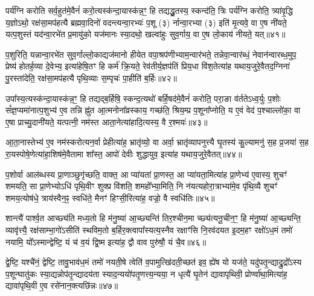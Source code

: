{\anuvakamend[{आ॒घा॒रम्प॑द्यन्ते॒ द्वाद॑शा॒त्मन्ने॒व य॒ज्ञस्य॒ मेध्य॑मे॒व खलु॒ वा अ॒ष्टाद॑श च}]}%

पर्य॑ग्नि करोति सर्व॒हुत॑मे॒वैनं॑ करो॒त्यस्क॑न्दा॒यास्क॑न्न॒ꣳ॒ हि तद्यद्धु॒तस्य॒ स्कन्द॑ति॒ त्रिः पर्य॑ग्नि करोति॒ त्र्या॑वृ॒द्धि य॒ज्ञो\-ऽथो॒ रक्ष॑सा॒मप॑हत्यै ब्रह्मवा॒दिनो॑ वदन्त्यन्वा॒रभ्यः॑ प॒शू (३) र्नान्वा॒रभ्या (३) इति॑ मृ॒त्यवे॒ वा ए॒ष नी॑यते॒ यत्प॒शुस्तं यद॑न्वा॒रभे॑त प्र॒मायु॑को॒ यज॑मानः स्या॒दथो॒ खल्वा॑हुः सुव॒र्गाय॒ वा ए॒ष लो॒काय॑ नीयते॒ यत्॥४१॥

प॒शुरिति॒ यन्नान्वा॒रभे॑त सुव॒र्गाल्लो॒काद्यज॑मानो हीयेत वपा॒श्रप॑णीभ्याम॒न्वार॑भते॒ तन्नेवा॒न्वार॑ब्धं॒ नेवान॑न्वारब्ध॒मुप॒ प्रेष्य॑ होतर्\mbox{}ह॒व्या दे॒वेभ्य॒ इत्या॑हेषि॒तꣳ हि कर्म॑ क्रि॒यते॒ रेव॑तीर्य॒ज्ञप॑तिं प्रिय॒धा वि॑श॒तेत्या॑ह यथाय॒जुरे॒वैतद॒ग्निना॑ पु॒रस्ता॑देति॒ रक्ष॑सा॒मप॑हत्यै पृथि॒व्याः स॒म्पृचः॑ पा॒हीति॑ ब॒र्\mbox{}हिः॥४२॥

उपा᳚स्य॒त्यस्क॑न्दा॒यास्क॑न्न॒ꣳ॒ हि तद्यद्ब॒र्\mbox{}हिषि॒ स्कन्द॒त्यथो॑ बर्\mbox{}हि॒षद॑मे॒वैनं॑ करोति॒ परा॒ङा व॑र्तते\-ऽध्व॒र्युः प॒शोः सं᳚ज्ञ॒प्यमा॑नात्प॒शुभ्य॑ ए॒व तन्नि ह्नु॑त आ॒त्मनोना᳚व्रस्काय॒ गच्छ॑ति॒ श्रिय॒म्प्र प॒शूना᳚प्नोति॒ य ए॒वं वेद॑ प॒श्चाल्लो॑का॒ वा ए॒षा प्राच्यु॒दानी॑यते॒ यत्पत्नी॒ नम॑स्त आता॒नेत्या॑हादि॒त्यस्य॒ वै र॒श्मयः॑॥४३॥

आ॒ता॒नास्तेभ्य॑ ए॒व नम॑स्करोत्यन॒र्वा प्रेहीत्या॑ह॒ भ्रातृ॑व्यो॒ वा अर्वा॒ भ्रातृ॑व्यापनुत्त्यै घृ॒तस्य॑ कु॒ल्यामनु॑ स॒ह प्र॒जया॑ स॒ह रा॒यस्पोषे॒णेत्या॑हा॒शिष॑मे॒वैतामा शा᳚स्त॒ आपो॑ देवीः शुद्धायुव॒ इत्या॑ह यथाय॒जुरे॒वैतत्॥४४॥

{\anuvakamend[{लो॒काय॑ नीयते॒ यद्ब॒र्\mbox{}ही र॒श्मयः॑ स॒प्तत्रिꣳ॑शच्च}]}%

प॒शोर्वा आल॑ब्धस्य प्रा॒णाञ्छुगृ॑च्छति॒ वाक्त॒ आ प्या॑यतां प्रा॒णस्त॒ आ प्या॑यता॒मित्या॑ह प्रा॒णेभ्य॑ ए॒वास्य॒ शुचꣳ॑ शमयति॒ सा प्रा॒णेभ्यो\-ऽधि॑ पृथि॒वीꣳ शुक्प्र वि॑शति॒ शमहो᳚भ्या॒मिति॒ नि न॑यत्यहोरा॒त्राभ्या॑मे॒व पृ॑थि॒व्यै शुचꣳ॑ शमय॒त्योष॑धे॒ त्राय॑स्वैन॒ꣴ॒ स्वधि॑ते॒ मैनꣳ॑ हिꣳसी॒रित्या॑ह॒ वज्रो॒ वै स्वधि॑तिः॥४५॥

शान्त्यै॑ पार्श्व॒त आच्छ्य॑ति मध्य॒तो हि म॑नु॒ष्या॑ आ॒च्छ्यन्ति॑ तिर॒श्चीन॒मा च्छ्य॑त्यनू॒चीन॒ꣳ॒ हि म॑नु॒ष्या॑ आ॒च्छ्यन्ति॒ व्यावृ॑त्त्यै॒ रक्ष॑साम्भा॒गो॑\-ऽसीति॑ स्थविम॒तो ब॒र्\mbox{}हिर॒क्त्वापा᳚स्यत्य॒स्नैव रक्षाꣳ॑सि नि॒रव॑दयत इ॒दम॒हꣳ रक्षो॑\-ऽध॒मं तमो॑ नयामि॒ यो᳚\-ऽस्मान्द्वेष्टि॒ यं च॑ व॒यं द्वि॒ष्म इत्या॑ह॒ द्वौ वाव पुरु॑षौ॒ यं चै॒व॥४६॥

द्वे॒ष्टि॒ यश्चै॑नं॒ द्वेष्टि॒ तावु॒भाव॑ध॒मं तमो॑ नयती॒षे त्वेति॑ व॒पामुत्खि॑दती॒च्छत॑ इव॒ ह्ये॑ष यो यज॑ते॒ यदु॑पतृ॒न्द्याद्रु॒द्रो᳚\-ऽस्य प॒शून्घातु॑कः स्या॒द्यन्नोप॑तृ॒न्द्यादय॑ता स्याद॒न्ययो॑पतृ॒णत्त्य॒न्यया॒ न धृत्यै॑ घृ॒तेन॑ द्यावापृथिवी॒ प्रोर्ण्वा॑था॒मित्या॑ह॒ द्यावा॑पृथि॒वी ए॒व रसे॑नान॒क्त्यछि॑न्नः॥४७॥

